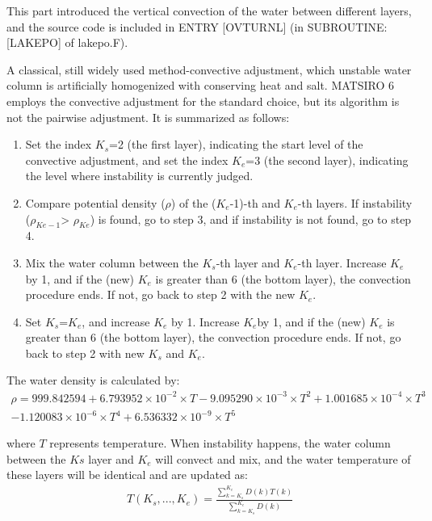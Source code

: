 This part introduced the vertical convection of the water between different layers, and the source code is included in ENTRY {[}OVTURNL{]} (in SUBROUTINE: {[}LAKEPO{]} of lakepo.F).

A classical, still widely used method-convective adjustment, which unstable water column is artificially homogenized with conserving heat and salt. MATSIRO 6 employs the convective adjustment for the
standard choice, but its algorithm is not the pairwise adjustment. It is summarized as follows:

\begin{enumerate}
\def\labelenumi{(\arabic{enumi})}
\item
  Set the index \(K_{s}\)=2 (the first layer), indicating the start level of the convective adjustment, and set the index \(K_{e}\)=3 (the second layer), indicating the level where instability is
  currently judged.
\item
  Compare potential density (\(\rho\)) of the (\(K_{e}\)-1)-th and \(K_{e}\)-th layers. If instability (\(\rho_{Ke-1}\)\textgreater{} \(\rho_{Ke}\)) is found, go to step 3, and if instability is not
  found, go to step 4.
\item
  Mix the water column between the \(K_{s}\)-th layer and \(K_{e}\)-th layer. Increase \(K_{e}\) by 1, and if the (new) \(K_{e}\) is greater than 6 (the bottom layer), the convection procedure ends.
  If not, go back to step 2 with the new \(K_{e}\).
\item
  Set \(K_{s}\)=\(K_{e}\), and increase \(K_{e}\) by 1. Increase \(K_{e}\)by 1, and if the (new) \(K_{e}\) is greater than 6 (the bottom layer), the convection procedure ends. If not, go back to step
  2 with new \(K_{s}\) and \(K_{e}\).
\end{enumerate}

The water density is calculated by: \begin{eqnarray}
\rho =999.842594+6.793952\times 10^{-2}\times T-9.095290\times 10^{-3}\times T^{2}+1.001685\times
      10^{-4}\times T^{3}\\ -1.120083\times 10^{-6}\times T^{4}+6.536332\times 10^{-9}\times T^{5}
\end{eqnarray}

where \(T\) represents temperature. When instability happens, the water column between the \(Ks\) layer and \(K_{e}\) will convect and mix, and the water temperature of these layers will be identical
and are updated as: \begin{eqnarray}
T(K_{s}, ..., K_{e})=\frac{\sum_{k=K_{s}}^{K_{e}}D(k)T(k)}{\sum_{k=K_{s}}^{K_{e}}D(k)}
\end{eqnarray}

